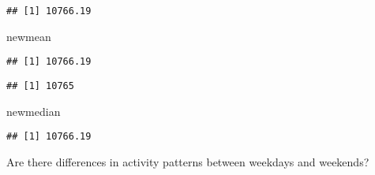 \documentclass[]{article}
\newenvironment{Shaded}{\begin{snugshade}}{\end{snugshade}}
\newcommand{\KeywordTok}[1]{\textcolor[rgb]{0.13,0.29,0.53}{\textbf{#1}}}
\newcommand{\DataTypeTok}[1]{\textcolor[rgb]{0.13,0.29,0.53}{#1}}
\newcommand{\StringTok}[1]{\textcolor[rgb]{0.31,0.60,0.02}{#1}}
\newcommand{\OtherTok}[1]{\textcolor[rgb]{0.56,0.35,0.01}{#1}}
\newcommand{\OperatorTok}[1]{\textcolor[rgb]{0.81,0.36,0.00}{\textbf{#1}}}
\newcommand{\NormalTok}[1]{#1}
\begin{document}
\begin{Shaded}
\end{Shaded}

\begin{verbatim}
## [1] 10766.19
\end{verbatim}

\begin{Shaded}
\begin{Highlighting}[]
\NormalTok{newmean}
\end{Highlighting}
\end{Shaded}

\begin{verbatim}
## [1] 10766.19
\end{verbatim}

\begin{Shaded}
\end{Shaded}

\begin{verbatim}
## [1] 10765
\end{verbatim}

\begin{Shaded}
\begin{Highlighting}[]
\NormalTok{newmedian}
\end{Highlighting}
\end{Shaded}

\begin{verbatim}
## [1] 10766.19
\end{verbatim}

Are there differences in activity patterns between weekdays and
weekends?
\end{document}

